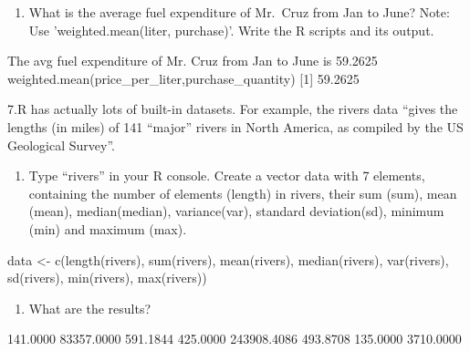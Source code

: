 \documentclass[
]{article}
\newenvironment{Shaded}{\begin{snugshade}}{\end{snugshade}}
\newcommand{\NormalTok}[1]{#1}
\providecommand{\tightlist}{%
  \setlength{\itemsep}{0pt}\setlength{\parskip}{0pt}}
\begin{document}
\begin{enumerate}
\def\labelenumi{\alph{enumi}.}
\setcounter{enumi}{1}
\tightlist
\item
  What is the average fuel expenditure of Mr.~Cruz from Jan to June?
  Note: Use 'weighted.mean(liter, purchase)'. Write the R scripts and
  its output.
\end{enumerate}

\begin{Shaded}
\begin{Highlighting}[]
\NormalTok{The avg fuel expenditure of Mr. Cruz from Jan to June is 59.2625}
\NormalTok{weighted.mean(price\_per\_liter,purchase\_quantity)}
\NormalTok{[1] 59.2625}
\end{Highlighting}
\end{Shaded}

7.R has actually lots of built-in datasets. For example, the rivers data
``gives the lengths (in miles) of 141 ``major'' rivers in North America,
as compiled by the US Geological Survey''.

\begin{enumerate}
\def\labelenumi{\alph{enumi}.}
\tightlist
\item
  Type ``rivers'' in your R console. Create a vector data with 7
  elements, containing the number of elements (length) in rivers, their
  sum (sum), mean (mean), median(median), variance(var), standard
  deviation(sd), minimum (min) and maximum (max).
\end{enumerate}

\begin{Shaded}
\begin{Highlighting}[]
\NormalTok{data \textless{}{-} c(length(rivers), sum(rivers), mean(rivers), median(rivers), var(rivers), sd(rivers), min(rivers), max(rivers))}
\end{Highlighting}
\end{Shaded}

\begin{enumerate}
\def\labelenumi{\alph{enumi}.}
\setcounter{enumi}{1}
\tightlist
\item
  What are the results?
\end{enumerate}

\begin{Shaded}
\begin{Highlighting}[]
\NormalTok{[1]141.0000  83357.0000    591.1844    425.0000 243908.4086    493.8708    135.0000   3710.0000 }
\end{Highlighting}
\end{Shaded}
\end{document}
